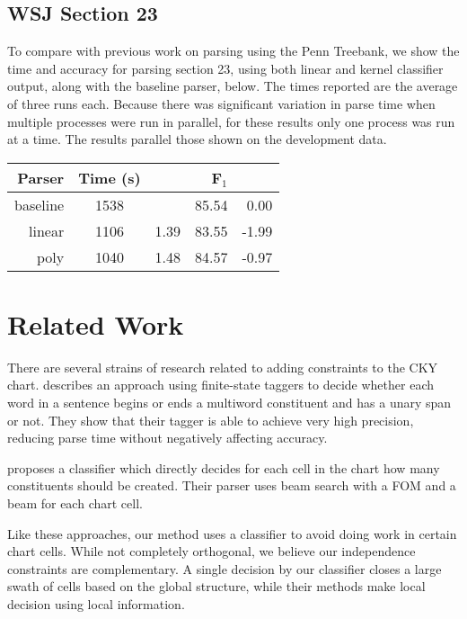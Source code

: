 \documentclass[11pt]{article}
\begin{document}
\subsection{WSJ Section 23}
\label{sec-5-4}

To compare with previous work on parsing using the Penn Treebank, we
show the time and accuracy for parsing section 23, using both linear
and kernel classifier output, along with the baseline parser, below.
The times reported are the average of three runs each. Because there
was significant variation in parse time when multiple processes were
run in parallel, for these results only one process was run at a time.
 The results parallel those shown on the development data.

\begin{center}
\begin{tabular}{rc@{}lrr}
Parser & Time (s) &  & F$_{\text{1}}$ & \\
\hline
baseline & 1538 &  & 85.54 & 0.00\\
linear & 1106 & \texttimes{}1.39 & 83.55 & -1.99\\
poly & 1040 & \texttimes{}1.48 & 84.57 & -0.97\\
\end{tabular}
\end{center}

\section{Related Work}
\label{sec-6}

There are several strains of research related to adding constraints to
the CKY chart. \cite{Roark2012} describes an approach using
finite-state taggers to decide whether each word in a sentence begins
or ends a multiword constituent and has a unary span or not. They show
that their tagger is able to achieve very high precision, reducing
parse time without negatively affecting accuracy.

\cite{Bodenstab2011} proposes a classifier which directly decides for
each cell in the chart how many constituents should be created. Their
parser uses beam search with a FOM and a beam for each chart cell.

Like these approaches, our method uses a classifier to avoid doing
work in certain chart cells. While not completely orthogonal, we
believe our independence constraints are complementary. A single
decision by our classifier closes a large swath of cells based on the
global structure, while their methods make local decision using local
information.
\end{document}
